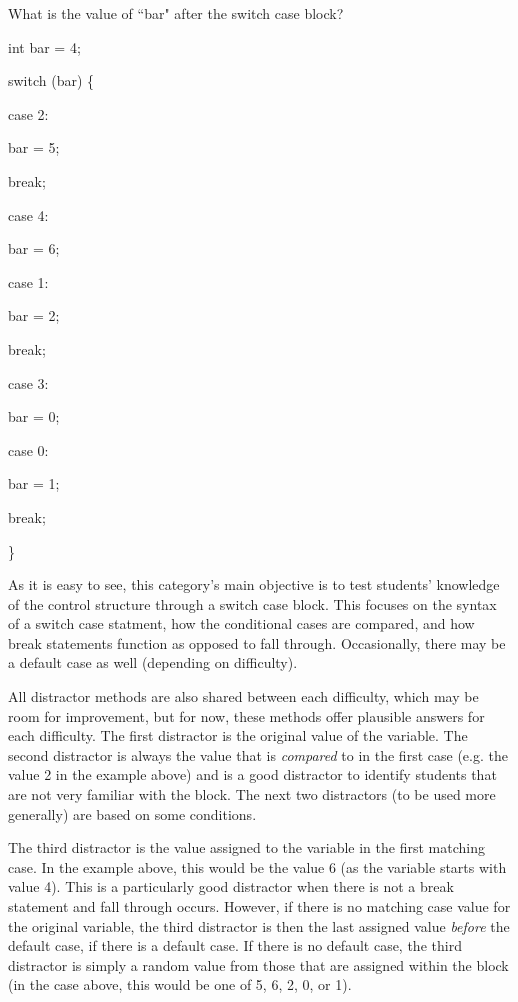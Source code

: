 \documentclass{article}
\begin{document}
\hfill \par
What is the value of ``bar" after the switch case block? \par
int bar = 4; \par
switch (bar) \{ \par
\indent\indent case 2: \par
\indent\indent \indent\indent bar = 5; \par
\indent\indent \indent\indent break; \par
\indent\indent case 4: \par
\indent\indent \indent\indent bar = 6; \par
\indent\indent case 1: \par
\indent\indent \indent\indent bar = 2; \par
\indent\indent \indent\indent break; \par
\indent\indent case 3: \par
\indent\indent \indent\indent bar = 0; \par
\indent\indent case 0: \par
\indent\indent\indent\indent bar = 1; \par
\indent\indent\indent\indent break; \par
\} \par
\hfill \par

As it is easy to see, this category's main objective is to test students' knowledge of the control structure through a switch case block. This focuses on the syntax of a switch case statment, how
the conditional cases are compared, and how break statements function as opposed to fall through. Occasionally, there may be a default case as well (depending on difficulty). 

All distractor methods are also shared between each difficulty, which may be room for improvement, but for now, these methods offer plausible answers for each difficulty. The first distractor is
the original value of the variable. The second distractor is always the value that is \textit{compared} to in the first case (e.g. the value 2 in the example above) and is a good distractor to identify students that are not very familiar with the block. The next two distractors (to be used more generally) are based on some conditions. 

The third distractor is the value assigned to the variable in the first matching case. In the example above, this would be the value 6 (as the variable starts with value 4). This is a particularly good distractor when there is not a break statement
and fall through occurs. However, if there is no matching case value for the original variable, the third distractor is then the last assigned value \textit{before} the default case, if there is a
default case. If there is no default case, the third distractor is simply a random value from those that are assigned within the block (in the case above, this would be one of 5, 6, 2, 0, or 1). 
\end{document}

